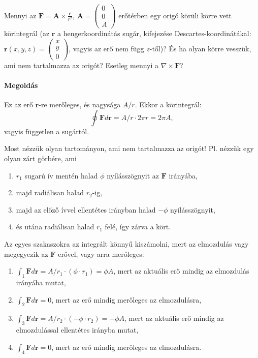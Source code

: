 \documentclass[12pt,a4paper]{scrartcl}
\let\mathbf\bm
\begin{document}
Mennyi az ${\mathbf{F}} = {\mathbf{A}} \times \frac{{\mathbf{r}}}{{{r^2}}}$, ${\mathbf{A}} = \left( {\begin{array}{*{20}{c}}
  0 \\ 
  0 \\ 
  A 
\end{array}} \right)$ erőtérben egy origó körüli körre vett körintegrál (az ${\mathbf{r}}$ a hengerkoordinátás sugár, kifejezése Descartes-koordinátákal: ${\mathbf{r}}\left( {x,y,z} \right) = \left( {\begin{array}{*{20}{c}}
  x \\ 
  y \\ 
  0 
\end{array}} \right)$, vagyis az erő nem függ $z$-től)? És ha olyan körre vesszük, ami nem tartalmazza az origót? Esetleg mennyi a $\nabla  \times {\mathbf{F}}$?
\paragraph{Megoldás}

Ez az erő ${\mathbf{r}}$-re merőleges, és nagysága ${A}/r$. Ekkor a körintegrál:
\[\oint {{\mathbf{F}}d{\mathbf{r}}}  = {A }/r \cdot 2\pi r = 2\pi {A },\] vagyis független a sugártól.

Most nézzük olyan tartományon, ami nem tartalmazza az origót! Pl. nézzük egy olyan zárt görbére, ami
\begin{enumerate}
\item  $r_1$ sugarú ív mentén halad $\phi$ nyílásszögnyit az ${\mathbf{F}}$ irányába,
\item majd radiálisan halad $r_2$-ig,
\item majd az előző ívvel ellentétes irányban halad  $- \phi$ nyílásszögnyit,
\item és utána radiálisan halad $r_1$ felé, így zárva a kört. 

\end{enumerate}
Az egyes szakaszokra az integrált könnyű kiszámolni, mert az elmozdulás vagy megegyezik az ${\mathbf{F}}$ erővel, vagy arra merőleges:
\begin{enumerate}
\item $\int_1 {{\mathbf{F}}d{\mathbf{r}}}  = {A }/{r_1} \cdot \left( {\phi  \cdot {r_1}} \right) = \phi {A }$, mert az aktuális erő mindig az elmozdulás irányába mutat,
\item $\int_2 {{\mathbf{F}}d{\mathbf{r}}}  = 0$, mert az erő mindig merőleges az elmozdulásra,
\item $\int_3 {{\mathbf{F}}d{\mathbf{r}}}  = {A }/{r_2} \cdot \left( { - \phi  \cdot {r_2}} \right) =  - \phi {A }$, mert az aktuális erő mindig az elmozdulással ellentétes irányba mutat,
\item $\int_4 {{\mathbf{F}}d{\mathbf{r}}}  = 0$, mert az erő mindig merőleges az elmozdulásra.
\end{enumerate}
\end{document}
